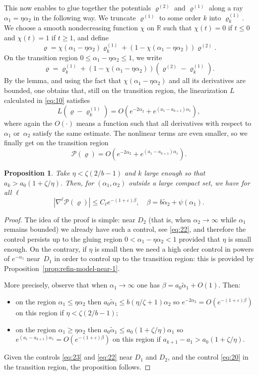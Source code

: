 \documentclass[JEP,XML,SOM,Unicode, NoEqCountersInSection, NoFloatCountersInSection]{cedram}
\theoremstyle{plain}
\newtheorem{prop}[thm]{Proposition}
\theoremstyle{definition}
\newcommand{\ta}{\tilde \alpha}
\newcommand{\opP}{\mathcal{P}}
\newcommand{\rhodeux}{\varrho^{(2)}}
\newcommand{\rhoun}{\varrho^{(1)}}
\begin{document}
This now enables to glue together the potentials $\rhodeux$ and $\rhoun$ along a ray $\alpha_1=\eta \alpha_2$ in the following way. We truncate $\rhoun$ to some order $k$ into $\rhoun_k$. We choose a smooth nondecreasing function $\chi$ on $\mathbb{R}$ such that $\chi(t)=0$ if $t\leq0$ and $\chi(t)=1$ if $t\geq1$, and define
\begin{equation}
\varrho = \chi(\alpha_1-\eta \alpha_2) \rhoun_k + (1-\chi(\alpha_1-\eta \alpha_2)) \rhodeux.\label{eq:19}
\end{equation}
On the transition region $0\leq\alpha_1-\eta \alpha_2\leq1$, we write $$\varrho=\rhoun_k+(1-\chi(\alpha_1-\eta\alpha_2))(\rhodeux-\rhoun_k).$$ By the lemma, and using the fact that $\chi(\alpha_1-\eta\alpha_2)$ and all its derivatives are bounded, one obtains that, still on the transition region, the linearization $L$ calculated in \eqref{eq:10} satisfies
\[ L(\varrho-\rhoun_k) = O(e^{-2\alpha_2}+e^{(a_1-a_{k+1}) \alpha_1}), \]
where again the $O(\cdot)$ means a function such that all derivatives with respect to $\alpha_1$ or~$\alpha_2$ satisfy the same estimate. The nonlinear terms are even smaller, so we finally get on the transition region
\begin{equation}
\opP(\varrho) = O(e^{-2\alpha_2}+e^{(a_1-a_{k+1}) \alpha_1}).\label{eq:20}
\end{equation}

\begin{prop}\label{prop:est-P}
Take $\eta<\zeta(2/b-1)$ and $k$ large enough so that $a_k>a_0(1+\zeta/\eta)$. Then, for $(\alpha_1,\alpha_2)$ outside a large compact set, we have for all $\ell$
\[ |\nabla^\ell \opP(\varrho)| \leq C_\ell e^{-(1+\varepsilon)\beta}, \quad \beta=b\ta_2+\psi(\alpha_1). \]
\end{prop}
\begin{proof}
The idea of the proof is simple: near $D_2$ (that is, when $\alpha_2\to\infty$ while $\alpha_1$ remains bounded) we already have such a control, see \eqref{eq:22}, and therefore the control persists up to the gluing region $0<\alpha_1-\eta \alpha_2<1$ provided that $\eta$ is small enough. On the contrary, if $\eta$ is small then we need a high order control in powers of $e^{-\alpha_1}$ near~$D_1$ in order to control up to the transition region: this is provided by Proposition~\ref{prop:refin-model-near-1}.

More precisely, observe that when $\alpha_1\to\infty$ one has $\beta= a_0\ta_1+O(1)$. Then:
\begin{itemize}
\item on the region $\alpha_1\leq \eta\alpha_2$ then $a_0\ta_1\leq b(\eta/\zeta+1)\alpha_2$ so $e^{-2\alpha_2}=O(e^{-(1+\varepsilon)\beta})$ on this region if $\eta<\zeta(2/b-1)$;
\item on the region $\alpha_1\geq \eta\alpha_2$ then $a_0\ta_1\leq a_0(1+\zeta/\eta) \alpha_1$ so $e^{(a_1-a_{k+1})\alpha_1}=O(e^{-(1+\varepsilon)\beta})$ on this region if $a_{k+1}-a_1>a_0(1+\zeta/\eta)$.
\end{itemize}
Given the controls \eqref{eq:23} and \eqref{eq:22} near $D_1$ and $D_2$, and the control \eqref{eq:20} in the transition region, the proposition follows.
\end{proof}
\end{document}
